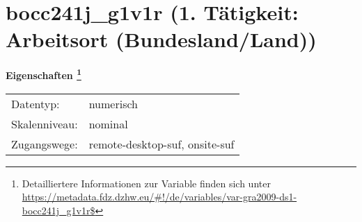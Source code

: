 
    \setcounter{footnote}{0}

    \vspace*{-1.8cm}
	\section{bocc241j\_g1v1r (1. Tätigkeit: Arbeitsort (Bundesland/Land))}
	\label{section:bocc241j_g1v1r}



    \vspace*{0.5cm}
    \noindent\textbf{Eigenschaften
	\footnote{Detailliertere Informationen zur Variable finden sich unter
		\url{https://metadata.fdz.dzhw.eu/\#!/de/variables/var-gra2009-ds1-bocc241j_g1v1r$}}}\\
	\begin{tabularx}{\hsize}{@{}lX}
	Datentyp: & numerisch \\
	Skalenniveau: & nominal \\
	Zugangswege: &
	  remote-desktop-suf, 
	  onsite-suf
 \\
    \end{tabularx}



